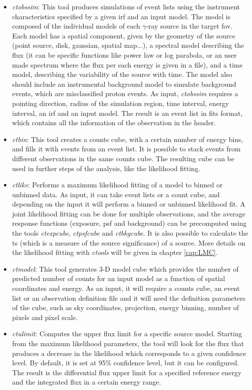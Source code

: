 \documentclass[main.tex]{subfiles}
\begin{document}
\begin{itemize}
\item \textit{ctobssim}: This tool produces simulations of event lists using the instrument characteristics specified by a given \gls{irf} and an input model. The model is composed of the individual models of each $\gamma$-ray source in the target \gls{fov}. Each model has a spatial component, given by the geometry of the source (point source, disk, gaussian, spatial map...), a spectral model describing the flux (it can be specific functions like power law or log parabola, or an user made spectrum where the flux per each energy is given in a file), and a time model, describing the variability of the source with time. The model also should include an instrumental background model to simulate background events, which are misclassified proton events.
  As input, \textit{ctobssim} requires a pointing direction, radius of the simulation region, time interval, energy interval, an \gls{irf} and an input model. The result is an event list in fits format, which contains all the information of the observation in the header.
\item \textit{ctbin}: This tool creates a counts cube, with a certain number of energy bins, and fills it with events from an event list. It is possible to stack events from different observations in the same counts cube. The resulting cube can be used in further steps of the analysis, like the likelihood fitting.
\item \textit{ctlike}: Performs a maximum likelihood fitting of a model to binned or unbinned data. As input, it can take event lists or a count cube, and depending on the input it will perform a binned or unbinned likelihood fit. A joint likelihood fitting can be done for multiple observations, and the average response functions (exposure, \gls{psf} and background) can be precomputed using the tools \textit{ctexpcube}, \textit{ctpsfcube} and \textit{ctbkgcube}. It is also possible to calculate the \gls{ts} (which is a measure of the source significance) of a source. More details on the likelihood fitting with \textit{ctools} will be given in chapter \ref{cap:LMC}.
\item \textit{ctmodel}: This tool generates 3-D model cube which provides the number of predicted number of counts for an input model as a function of spatial coordinates and energy. As an input, it will require a counts cube, an event list or an observation definition file and it will need the definition parameters of the cube, such as sky coordinates, projection, energy binning, number of pixels and pixel scale.
\item \textit{ctulimit}: Computes the upper flux limit for a specific source model. Starting from the maximum likelihood parameters, the tool will look for the flux that produces a decrease in the likelihood which corresponds to a given confidence level. By default, it is set at 95\% confidence level, but it can be configured. The result is the differential flux upper limit for a specified reference energy and the integrated flux in a certain energy range.
  
\end{itemize}
\end{document}
